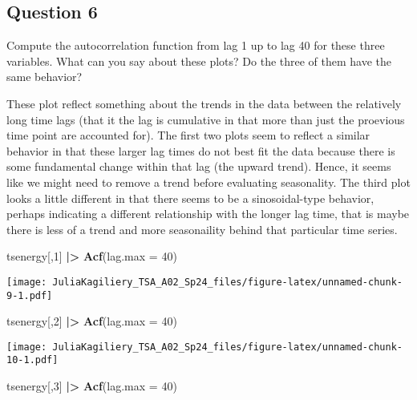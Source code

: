 \documentclass[
]{article}
\newenvironment{Shaded}{\begin{snugshade}}{\end{snugshade}}
\newcommand{\AttributeTok}[1]{\textcolor[rgb]{0.13,0.29,0.53}{#1}}
\newcommand{\DecValTok}[1]{\textcolor[rgb]{0.00,0.00,0.81}{#1}}
\newcommand{\FunctionTok}[1]{\textcolor[rgb]{0.13,0.29,0.53}{\textbf{#1}}}
\newcommand{\NormalTok}[1]{#1}
\newcommand{\SpecialCharTok}[1]{\textcolor[rgb]{0.81,0.36,0.00}{\textbf{#1}}}
\begin{document}
\hypertarget{question-6}{%
\subsection{Question 6}\label{question-6}}

Compute the autocorrelation function from lag 1 up to lag 40 for these
three variables. What can you say about these plots? Do the three of
them have the same behavior?

These plot reflect something about the trends in the data between the
relatively long time lags (that it the lag is cumulative in that more
than just the proevious time point are accounted for). The first two
plots seem to reflect a similar behavior in that these larger lag times
do not best fit the data because there is some fundamental change within
that lag (the upward trend). Hence, it seems like we might need to
remove a trend before evaluating seasonality. The third plot looks a
little different in that there seems to be a sinosoidal-type behavior,
perhaps indicating a different relationship with the longer lag time,
that is maybe there is less of a trend and more seasonaility behind that
particular time series.

\begin{Shaded}
\begin{Highlighting}[]
\NormalTok{tsenergy[,}\DecValTok{1}\NormalTok{] }\SpecialCharTok{|\textgreater{}}
  \FunctionTok{Acf}\NormalTok{(}\AttributeTok{lag.max =} \DecValTok{40}\NormalTok{)}
\end{Highlighting}
\end{Shaded}

\texttt{[image: JuliaKagiliery\_TSA\_A02\_Sp24\_files/figure-latex/unnamed-chunk-9-1.pdf]}

\begin{Shaded}
\begin{Highlighting}[]
\NormalTok{tsenergy[,}\DecValTok{2}\NormalTok{] }\SpecialCharTok{|\textgreater{}}
  \FunctionTok{Acf}\NormalTok{(}\AttributeTok{lag.max =} \DecValTok{40}\NormalTok{)}
\end{Highlighting}
\end{Shaded}

\texttt{[image: JuliaKagiliery\_TSA\_A02\_Sp24\_files/figure-latex/unnamed-chunk-10-1.pdf]}

\begin{Shaded}
\begin{Highlighting}[]
\NormalTok{tsenergy[,}\DecValTok{3}\NormalTok{] }\SpecialCharTok{|\textgreater{}}
  \FunctionTok{Acf}\NormalTok{(}\AttributeTok{lag.max =} \DecValTok{40}\NormalTok{)}
\end{Highlighting}
\end{Shaded}
\end{document}
